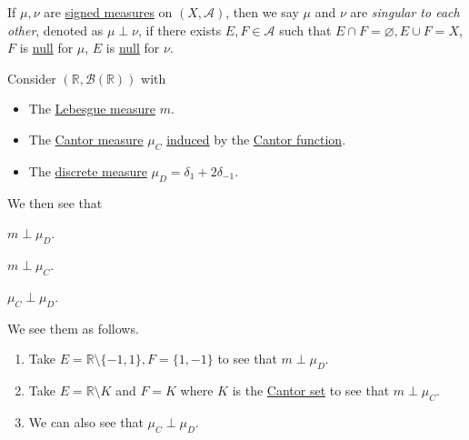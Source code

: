 \begin{definition}[Singular]\label{def:singular}
	If \(\mu,\nu\) are \hyperref[def:signed-measure]{signed measures} on \((X, \mathcal{A})\), then we say \(\mu\) and \(\nu \) are \emph{singular to each other}, denoted as
	\(\mu \perp \nu\), if there exists \(E,F \in \mathcal{A}\) such that \(E \cap F = \varnothing, E \cup F = X\), \(F\) is \hyperref[def:null-set-for-a-signed-measure]{null}
	for \(\mu\), \(E\) is \hyperref[def:null-set-for-a-signed-measure]{null} for \(\nu\).
\end{definition}

\begin{eg}
	Consider \((\mathbb{R}, \mathcal{B}(\mathbb{R}))\) with
	\begin{itemize}
		\item The \hyperref[def:Lebesgue-measure]{Lebesgue measure} \(m\).
		\item The \hyperref[def:Cantor-measure]{Cantor measure} \(\mu_C\) \hyperref[def:Lebesgue-Stieltjes-measure]{induced} by the \hyperref[sssec:Cantor-Function]{Cantor function}.
		\item The \hyperref[eg:discrete-measure]{discrete measure} \(\mu_D = \delta_1 + 2\delta_{-1}\).
	\end{itemize}

	We then see that
	\begin{enumerate*}[(1)]
		\item \(m\perp \mu _D\).
		\item \(m\perp \mu _C\).
		\item \(\mu _C \perp \mu _D\).
	\end{enumerate*}
\end{eg}
\begin{explanation}
	We see them as follows.
	\begin{enumerate}[(1)]
		\item Take \(E = \mathbb{R} \setminus \{-1,1\}, F = \{1,-1\}\) to see that \(m \perp \mu_D\).
		\item Take \(E = \mathbb{R} \setminus K\) and \(F = K\) where \(K\) is the \hyperref[eg:lec8:Cantor-set]{Cantor set} to see that \(m \perp \mu_C\).
		\item We can also see that \(\mu_C \perp \mu_D\).
	\end{enumerate}
\end{explanation}

